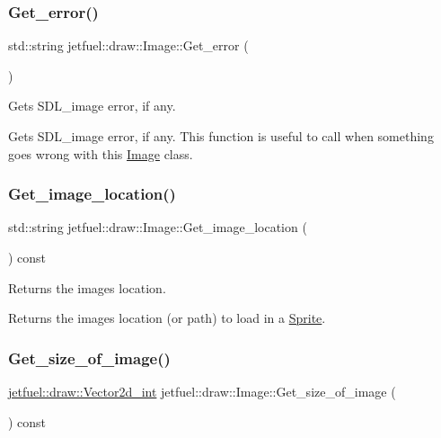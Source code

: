 \subsubsection{\texorpdfstring{Get\+\_\+error()}{Get\_error()}}
{\footnotesize\ttfamily std\+::string jetfuel\+::draw\+::\+Image\+::\+Get\+\_\+error (\begin{DoxyParamCaption}{ }\end{DoxyParamCaption})\hspace{0.3cm}{\ttfamily [inline]}}



Gets S\+D\+L\+\_\+image error, if any. 

Gets S\+D\+L\+\_\+image error, if any. This function is useful to call when something goes wrong with this \hyperlink{classjetfuel_1_1draw_1_1Image}{Image} class. \mbox{\label{classjetfuel_1_1draw_1_1Image_afe13a343f0ca098c2f258511fa6a2f2b}} 
\subsubsection{\texorpdfstring{Get\+\_\+image\+\_\+location()}{Get\_image\_location()}}
{\footnotesize\ttfamily std\+::string jetfuel\+::draw\+::\+Image\+::\+Get\+\_\+image\+\_\+location (\begin{DoxyParamCaption}{ }\end{DoxyParamCaption}) const\hspace{0.3cm}{\ttfamily [inline]}}



Returns the image\textquotesingle{}s location. 

Returns the image\textquotesingle{}s location (or path) to load in a \hyperlink{classjetfuel_1_1draw_1_1Sprite}{Sprite}. \mbox{\label{classjetfuel_1_1draw_1_1Image_a69eb09128ebcbf427eac516d0c042ce5}} 
\subsubsection{\texorpdfstring{Get\+\_\+size\+\_\+of\+\_\+image()}{Get\_size\_of\_image()}}
{\footnotesize\ttfamily \hyperlink{classjetfuel_1_1draw_1_1Vector2d}{jetfuel\+::draw\+::\+Vector2d\+\_\+int} jetfuel\+::draw\+::\+Image\+::\+Get\+\_\+size\+\_\+of\+\_\+image (\begin{DoxyParamCaption}{ }\end{DoxyParamCaption}) const\hspace{0.3cm}{\ttfamily [inline]}}



